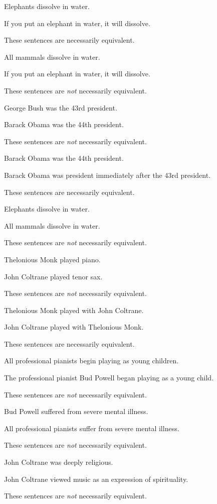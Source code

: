 \begin{earg}
\item Elephants dissolve in water.
\item[]	If you put an elephant in water, it will dissolve.
\item[]These sentences are necessarily equivalent.\smallskip

\item All mammals dissolve in water.
\item[]	If you put an elephant in water, it will dissolve.
\item[] These sentences are \textit{not} necessarily equivalent.\smallskip 

\item George Bush was the 43rd president. 
\item[]	Barack Obama was the 44th president.
\item[] These sentences are \textit{not} necessarily equivalent.\smallskip
 
\item Barack Obama was the 44th president.
\item[]	Barack Obama was president immediately after the 43rd president.
\item[] These sentences are necessarily equivalent.\smallskip 

\item Elephants dissolve in water. 
\item[]	All mammals dissolve in water.
\item[] These sentences are \textit{not} necessarily equivalent.\smallskip

\item  Thelonious Monk played piano.
	\item[]	John Coltrane played tenor sax.
	\item[] These sentences are \textit{not} necessarily equivalent.\smallskip 
\item  Thelonious Monk played with John Coltrane.
	\item[]	John Coltrane played with Thelonious Monk.
	\item[] These sentences are necessarily equivalent.\smallskip
	
\item  All professional pianists begin playing as young children.
	\item[]	The professional pianist Bud Powell began playing as a young child.
	\item[] These sentences are \textit{not} necessarily equivalent.\smallskip
\item  Bud Powell suffered from severe mental illness.
	\item[]	All professional pianists suffer from severe mental illness.
	\item[] These sentences are \textit{not} necessarily equivalent.\smallskip
\item John Coltrane was deeply religious.	
\item[]	John Coltrane viewed music as an expression of spirituality.
\item[] These sentences are \textit{not} necessarily equivalent. 
\end{earg}

